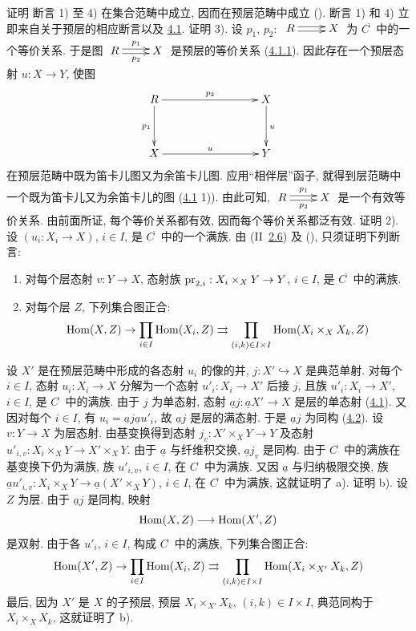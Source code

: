 \begin{enonce*}[remark]{证明}
断言\pageoriginale{} 1) 至 4) 在集合范畴中成立,
因而在预层范畴中成立 ().
断言 1) 和 4) 立即来自关于预层的相应断言以及 \hyperref[II.theo4.1]{4.1}.
证明 3). 设 $p_1$, $p_2:$
$\xymatrix{R\ar@<2pt>[r] \ar@<-2pt>[r]& X}$
为 $C^{\widetilde{\phantom{,}}}$ 中的一个等价关系.
于是图 $\xymatrix{R \ar@<2pt>[r]^{p_1} \ar@<-2pt>[r]_{p_2}&X}$
是预层的等价关系 (\hyperref[II.cor4.1.1]{4.1.1}).
因此存在一个预层态射 $u:X\rightarrow Y$, 使图
\[
\xymatrix@C=3cm@R=1.25cm{
R \ar[r]^{p_2} \ar[d]_{p_1}& X\ar[d]^{u}\\
X \ar[r]^{u}& Y }
\]
在预层范畴中既为笛卡儿图又为余笛卡儿图.
应用“相伴层”函子, 就得到层范畴中一个既为笛卡儿又为余笛卡儿的图
(\hyperref[II.theo4.1]{4.1} 1)).
由此可知,
$\xymatrix{R \ar@<2pt>[r]^{p_1} \ar@<-2pt>[r]_{p_2}&X}$
是一个有效等价关系.
由前面所证, 每个等价关系都有效, 因而每个等价关系都泛有效.
证明 2). 设 $(u_i:X_i\rightarrow X)$, $i\in I$,
是 $C^{\widetilde{\phantom{,}}}$ 中的一个满族.
由 (II\ \hyperref[II.prop2.6]{2.6})
及 (), 只须证明下列断言:
\begin{enumerate}
\renewcommand{\theenumi}{\alph{enumi}}
\renewcommand{\labelenumi}{\theenumi)}
\item 对每个层态射 $v:Y\rightarrow X$,
态射族 $\operatorname{pr}_{2,i}:X_i\times_X Y\rightarrow Y$, $i\in I$,
是 $C^{\widetilde{\phantom{,}}}$ 中的满族.

\item 对每个层 $Z$, 下列集合图正合:
$$
\operatorname{Hom}(X,Z)\rightarrow \prod_{i\in I} \operatorname{Hom}(X_i,Z)\rightrightarrows
\prod_{(i,k)\in I\times I}\operatorname{Hom}(X_i\times_X X_k,Z)
$$
\end{enumerate}
\end{enonce*}

设\pageoriginale{} $X'$ 是在预层范畴中形成的各态射 $u_i$ 的像的并,
$j:X'\hookrightarrow X$ 是典范单射.
对每个 $i\in I$, 态射 $u_i:X_i\rightarrow X$
分解为一个态射 $u'_i:X_i\rightarrow X'$ 后接 $j$,
且族 $u'_i:X_i\rightarrow X'$, $i\in I$,
是 $C^{\widehat{\phantom{,}}}$ 中的满族.
由于 $j$ 为单态射, 态射
$\underline{a}j:\underline{a}X'\rightarrow X$ 是层的单态射
(\hyperref[II.theo4.1]{4.1}).
又因对每个 $i\in I$, 有 $u_i=\underline{a}j\underline{a}u'_i$,
故 $\underline{a}j$ 是层的满态射.
于是 $\underline{a}j$ 为同构 (\hyperref[II.prop4.2]{4.2}).
设 $v:Y\rightarrow X$ 为层态射.
由基变换得到态射 $j_v:X'\times_X Y\rightarrow Y$
及态射 $u'_{i,v}:X_i\times_X Y\rightarrow X'\times_X Y$.
由于 $\underline{a}$ 与纤维积交换, $\underline{a}j_v$ 是同构.
由于 $C^{\widehat{\phantom{,}}}$ 中的满族在基变换下仍为满族,
族 $u'_{i,v}$, $i\in I$, 在 $C^{\widehat{\phantom{,}}}$ 中为满族.
又因 $\underline{a}$ 与归纳极限交换,
族 $\underline{a}u'_{i,v}:X_i\times_X Y\rightarrow
\underline{a}(X'\times_X Y)$, $i\in I$,
在 $C^{\widetilde{\phantom{,}}}$ 中为满族, 这就证明了 a).
证明 b). 设 $Z$ 为层. 由于 $\underline{a}j$ 是同构, 映射
$$
\operatorname{Hom}(X,Z)\longrightarrow \operatorname{Hom}(X',Z)
$$
是双射.
由于各 $u'_i$, $i\in I$,
构成 $C^{\widehat{\phantom{,}}}$ 中的满族, 下列集合图正合:
$$
\operatorname{Hom}(X',Z)\rightarrow \prod_{i\in I} \operatorname{Hom}(X_i,Z)\rightrightarrows
\prod_{(i,k)\in I\times I}\operatorname{Hom}(X_i\times_{X'}X_k, Z)
$$
最后, 因为 $X'$ 是 $X$ 的子预层,
预层 $X_i\times_{X'}X_k$, $(i,k)\in I\times I$,
典范同构于 $X_i\times_X X_k$, 这就证明了 b).

